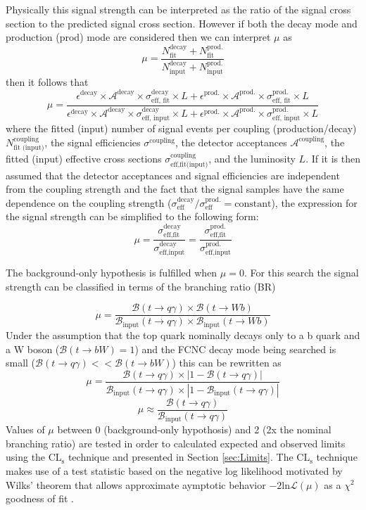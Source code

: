 Physically this signal strength can be interpreted as the ratio of the signal cross section to the predicted signal cross section.  However if both the decay mode and production (prod) mode are considered then we can interpret $\mu$ as 
\[\mu = \frac{N_\text{fit}^\text{decay} + N_\text{fit}^\text{prod.}}{N_\text{input}^\text{decay} + N_\text{input}^\text{prod.}}
\]then it follows that 
\[\mu = \frac{\epsilon^\text{decay}\times \mathcal{A}^\text{decay} \times \sigma^\text{decay}_\text{eff, fit}\times L+\epsilon^\text{prod.}\times \mathcal{A}^\text{prod.} \times \sigma^\text{prod.}_\text{eff, fit} \times L}{\epsilon^\text{decay}\times \mathcal{A}^\text{decay} \times \sigma^\text{decay}_\text{eff, input} \times L+\epsilon^\text{prod.}\times \mathcal{A}^\text{prod.} \times \sigma^\text{prod.}_\text{eff, input}\times L}
\]
where the fitted (input) number of signal events per coupling (production/decay) $N_\text{fit (input)}^\text{coupling}$, the signal efficiencies $\sigma^\text{coupling}$, the detector acceptances $\mathcal{A}^\text{coupling}$, the fitted (input) effective cross sections $\sigma_\text{eff,fit(input)}^\text{coupling}$, and the luminosity $L$.  If it is then assumed that the detector acceptances and signal efficiencies are independent from the coupling strength and the fact that the signal samples have the same dependence on the coupling strength ($\sigma_\text{eff}^\text{decay}/ \sigma_\text{eff}^\text{prod.} = \text{constant}$), the expression for the signal strength can be simplified to the following form:
\[ \mu = \frac{\sigma_\text{eff,fit}^\text{decay}}{\sigma_\text{eff,input}^\text{decay}}=\frac{\sigma_\text{eff,fit}^\text{prod.}}{\sigma_\text{eff,input}^\text{prod.}}
\]

The background-only hypothesis is fulfilled when $\mu=0$.
For this search the signal strength can be classified in terms of the branching ratio (BR)

\[ \mu = \frac{\mathcal{B}(t\rightarrow q\gamma) \times \mathcal{B}(t\rightarrow Wb)}{\mathcal{B}_\text{input}(t\rightarrow q\gamma) \times \mathcal{B}_\text{input}(t\rightarrow Wb)}
\]
Under the assumption that the top quark nominally decays only to a b quark and a W boson ($\mathcal{B}(t\rightarrow bW)=1$) and the FCNC decay mode being searched is small ($\mathcal{B}(t\rightarrow q\gamma) << \mathcal{B}(t\rightarrow bW)$) this can be rewritten as 
\[ \mu = \frac{\mathcal{B}(t\rightarrow q\gamma) \times|1-\mathcal{B}(t\rightarrow q\gamma)|}{\mathcal{B}_\text{input}(t\rightarrow q\gamma) \times|1-\mathcal{B}_\text{input}(t\rightarrow q\gamma)|}
\]
\[ \mu \approx \frac{\mathcal{B}(t\rightarrow q\gamma)}{\mathcal{B}_\text{input}(t\rightarrow q\gamma)}
\]
Values of $\mu$ between 0 (background-only hypothosis) and 2 (2x the nominal branching ratio) are tested in order to calculated expected and observed limits using the $\text{CL}_\text{s}$ technique\cite{Read:2002hq} and presented in Section \ref{sec:Limits}.  The $\text{CL}_\text{s}$ technique makes use of a test statistic based on the negative log likelihood motivated by  Wilks' theorem that allows approximate aymptotic behavior $-2 \text{ln} \mathcal{L}(\mu)$ as a $\chi^2$ goodness of fit \cite{Wilks:1938dza}. %




